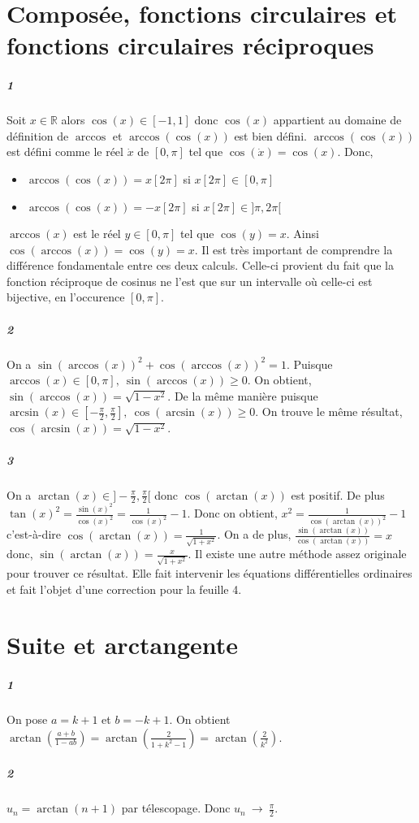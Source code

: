 \documentclass[10pt,a4paper]{article}
\begin{document}
\section{Composée, fonctions circulaires et fonctions circulaires réciproques}
\subparagraph{1} Soit $x \in \mathbb{R}$ alors $\cos(x) \in [-1,1]$ donc $\cos(x)$ appartient au domaine de définition de $\arccos$ et $\arccos(\cos(x))$ est bien défini. $\arccos(\cos(x))$ est défini comme le réel $\dot{x}$ de $[0,\pi]$ tel que $\cos(\dot{x}) = \cos(x)$. Donc,
\begin{itemize}
\item $\arccos(\cos(x)) = x [2\pi]$ si $x[2\pi] \in [0,\pi]$
\item $\arccos(\cos(x)) = -x [2\pi]$ si $x[2\pi] \in ]\pi,2\pi[$
\end{itemize}
$\arccos(x)$ est le réel $y \in [0,\pi]$ tel que $\cos(y) = x$. Ainsi $\cos(\arccos(x)) = \cos(y) = x$. Il est très important de comprendre la différence fondamentale entre ces deux calculs. Celle-ci provient du fait que la fonction réciproque de cosinus ne l'est que sur un intervalle où celle-ci est bijective, en l'occurence $[0,\pi]$.
\subparagraph{2}On a $\sin(\arccos(x))^2 + \cos(\arccos(x))^2 = 1$. Puisque $\arccos(x) \in [0,\pi], \ \sin(\arccos(x)) \ge 0$. On obtient, $\sin(\arccos(x)) = \sqrt{1-x^2}$. De la même manière puisque $\arcsin(x) \in [-\frac{\pi}{2},\frac{\pi}{2}], \ \cos(\arcsin(x)) \ge 0$. On trouve le même résultat, $\cos(\arcsin(x)) = \sqrt{1-x^2}$.
\subparagraph{3}On a $\arctan(x) \in ]-\frac{\pi}{2}, \frac{\pi}{2}[$ donc $\cos(\arctan(x))$ est positif. De plus $\tan(x)^2 = \frac{\sin(x)^2}{\cos(x)^2} = \frac{1}{\cos(x)^2}-1$. Donc on obtient, $x^2 = \frac{1}{\cos(\arctan(x))^2}-1$ c'est-à-dire $\cos(\arctan(x)) = \frac{1}{\sqrt{1+x^2}}$. On a de plus, $\frac{\sin(\arctan(x))}{\cos(\arctan(x))} = x$ donc, $\sin(\arctan(x)) = \frac{x}{\sqrt{1+x^2}}$. Il existe une autre méthode assez originale pour trouver ce résultat. Elle fait intervenir les équations différentielles ordinaires et fait l'objet d'une correction pour la feuille 4.

\section{Suite et arctangente}
\subparagraph{1}On pose $a = k+1$ et $b = -k+1$. On obtient $\arctan \left( \frac{a+b}{1-ab}\right) = \arctan\left( \frac{2}{1+ k^2 - 1}\right) = \arctan \left( \frac{2}{k^2}\right)$.
\subparagraph{2} $u_n = \arctan(n+1)$ par télescopage. Donc $u_n \ \longrightarrow \ \frac{\pi}{2}$.
\end{document}
